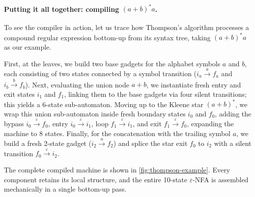 \paragraph{Putting it all together: compiling $(a+b)^*a$.}
To see the compiler in action, let us trace how Thompson's algorithm processes a compound regular expression bottom-up from its syntax tree, taking $(a+b)^*a$ as our example.

First, at the leaves, we build two base gadgets for the alphabet symbols $a$ and $b$, each consisting of two states connected by a symbol transition ($i_a \xrightarrow{a} f_a$ and $i_b \xrightarrow{b} f_b$).
Next, evaluating the union node $a+b$, we instantiate fresh entry and exit states $i_1$ and $f_1$, linking them to the base gadgets via four silent transitions; this yields a 6-state sub-automaton.
Moving up to the Kleene star $(a+b)^*$, we wrap this union sub-automaton inside fresh boundary states $i_0$ and $f_0$, adding the bypass $i_0 \xrightarrow{\varepsilon} f_0$, entry $i_0 \xrightarrow{\varepsilon} i_1$, loop $f_1 \xrightarrow{\varepsilon} i_1$, and exit $f_1 \xrightarrow{\varepsilon} f_0$, expanding the machine to 8 states.
Finally, for the concatenation with the trailing symbol $a$, we build a fresh 2-state gadget ($i_2 \xrightarrow{a} f_2$) and splice the star exit $f_0$ to $i_2$ with a silent transition $f_0 \xrightarrow{\varepsilon} i_2$.

The complete compiled machine is shown in \cref{fig:thompson-example}. Every component retains its local structure, and the entire 10-state $\varepsilon$-NFA is assembled mechanically in a single bottom-up pass.

